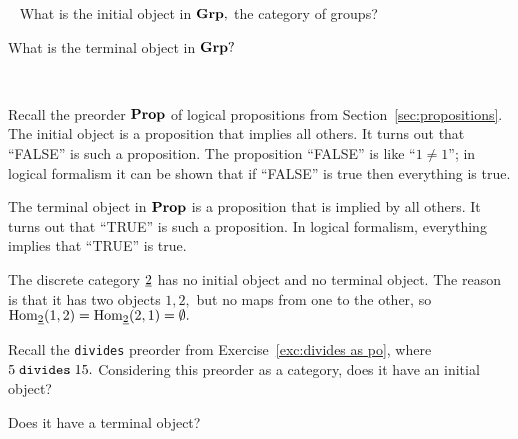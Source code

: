 \documentclass[../main/CT4S-EN-RU]{subfiles}
\begin{document}
\begin{exampleRUS}\label{ex:initial monoid terminal monoid}
\end{exampleRUS}

\begin{exerciseENG}~
\sexc What is the initial object in ${\mathbf{Grp}},$ the category of groups?
\item What is the terminal object in ${\mathbf{Grp}}?$
\endsexc
\end{exerciseENG}

\begin{exerciseRUS}~
\end{exerciseRUS}

\begin{exampleENG}
Recall the preorder ${\mathbf{Prop}}$ of logical propositions from Section~\ref{sec:propositions}. The initial object is a proposition that implies all others. It turns out that “FALSE” is such a proposition. The proposition “FALSE” is like “$1\neq1$”; in logical formalism it can be shown that if “FALSE” is true then everything is true.

The terminal object in ${\mathbf{Prop}}$ is a proposition that is implied by all others. It turns out that “TRUE” is such a proposition. In logical formalism, everything implies that “TRUE” is true.
\end{exampleENG}

\begin{exampleRUS}
\end{exampleRUS}

\begin{exampleENG}
The discrete category $\underline{2}$ has no initial object and no terminal object. The reason is that it has two objects $1,2,$ but no maps from one to the other, so $\operatorname{Hom}_{\underline{2}}(1,2)=\operatorname{Hom}_{\underline{2}}(2,1)=\emptyset.$
\end{exampleENG}

\begin{exampleRUS}
\end{exampleRUS}

\begin{exerciseENG}
Recall the {\tt divides} preorder from Exercise~\ref{exc:divides as po}, where $5\;{\tt divides}\;15.$
\sexc Considering this preorder as a category, does it have an initial object?
\item Does it have a terminal object?
\endsexc
\end{exerciseENG}

\begin{exerciseRUS}
\end{exerciseRUS}
\end{document}
